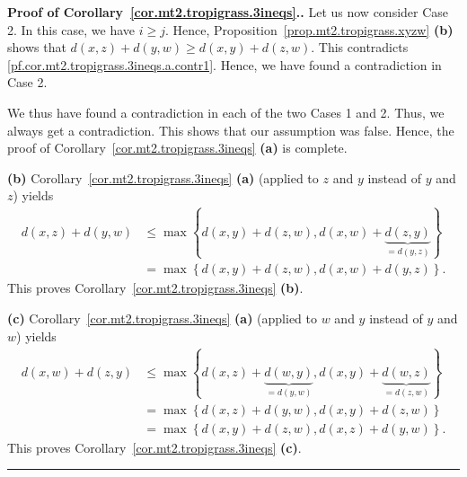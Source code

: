 \documentclass[numbers=enddot,12pt,final,onecolumn,notitlepage]{scrartcl}%
\theoremstyle{definition}
\newenvironment{proof}[1][Proof]{\noindent\textbf{#1.} }{\ \rule{0.5em}{0.5em}}
\newcommand{\set}[1]{\left\{ #1 \right\}}
\newcommand{\tup}[1]{\left( #1 \right)}
\begin{document}
\begin{proof}[Proof of Corollary~\ref{cor.mt2.tropigrass.3ineqs}.]
Let us now consider Case 2.
In this case, we have $i \geq j$.
Hence, Proposition~\ref{prop.mt2.tropigrass.xyzw} \textbf{(b)}
shows that
$d \tup{x, z} + d \tup{y, w} \geq d \tup{x, y} + d \tup{z, w}$.
This contradicts \eqref{pf.cor.mt2.tropigrass.3ineqs.a.contr1}.
Hence, we have found a contradiction in Case 2.

We thus have found a contradiction in each of the two Cases
1 and 2.
Thus, we always get a contradiction.
This shows that our assumption was false.
Hence, the proof of
Corollary~\ref{cor.mt2.tropigrass.3ineqs} \textbf{(a)}
is complete.

\textbf{(b)}
Corollary~\ref{cor.mt2.tropigrass.3ineqs} \textbf{(a)}
(applied to $z$ and $y$ instead of $y$ and $z$) yields
\begin{align*}
d \tup{x, z} + d \tup{y, w}
&\leq \max
  \set{ d \tup{x, y} + d \tup{z, w},
        d \tup{x, w} + \underbrace{d \tup{z, y}}_{= d \tup{y, z} } }
  \\
&= \max
  \set{ d \tup{x, y} + d \tup{z, w}, d \tup{x, w} + d \tup{y, z} } .
\end{align*}
This proves
Corollary~\ref{cor.mt2.tropigrass.3ineqs} \textbf{(b)}.

\textbf{(c)}
Corollary~\ref{cor.mt2.tropigrass.3ineqs} \textbf{(a)}
(applied to $w$ and $y$ instead of $y$ and $w$) yields
\begin{align*}
d \tup{x, w} + d \tup{z, y}
&\leq \max
  \set{ d \tup{x, z} + \underbrace{d \tup{w, y}}_{= d \tup{y, w}},
        d \tup{x, y} + \underbrace{d \tup{w, z}}_{= d \tup{z, w} } }
  \\
&= \max
  \set{ d \tup{x, z} + d \tup{y, w}, d \tup{x, y} + d \tup{z, w} } \\
&= \max
  \set{ d \tup{x, y} + d \tup{z, w}, d \tup{x, z} + d \tup{y, w} } .
\end{align*}
This proves
Corollary~\ref{cor.mt2.tropigrass.3ineqs} \textbf{(c)}.
\end{proof}
\end{document}
